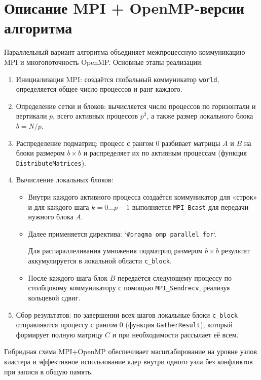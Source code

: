\documentclass[14pt,a4paper]{extarticle}
\begin{document}
\section{Описание MPI + OpenMP-версии алгоритма}

Параллельный вариант алгоритма объединяет межпроцессную коммуникацию MPI и многопоточность OpenMP. Основные этапы реализации:
\begin{enumerate}
  \item Инициализация MPI: создаётся глобальный коммуникатор \texttt{world}, определяется общее число процессов и ранг каждого.
  \item Определение сетки и блоков: вычисляется число процессов по горизонтали и вертикали \(p\), всего активных процессов \(p^2\), а также размер локального блока \(b = N / p\).
  \item Распределение подматриц: процесс с рангом 0 разбивает матрицы \(A\) и \(B\) на блоки размером \(b\times b\) и распределяет их по активным процессам (функция \texttt{DistributeMatrices}).
  \item Вычисление локальных блоков:
    \begin{itemize}
      \item Внутри каждого активного процесса создаётся коммуникатор для «строк» и для каждого шага \(k = 0\dots p-1\) выполняется \texttt{MPI\_Bcast} для передачи нужного блока \(A\).
      \item Далее применяется директива: `\texttt{\#pragma omp parallel for}`.

      Для распараллеливания умножения подматриц размером \(b\times b\) результат аккумулируется в локальной области \texttt{c\_block}.
      \item После каждого шага блок \(B\) передаётся следующему процессу по столбцовому коммуникатору с помощью \texttt{MPI\_Sendrecv}, реализуя кольцевой сдвиг.
    \end{itemize}
  \item Сбор результатов: по завершении всех шагов локальные блоки \texttt{c\_block} отправляются процессу с рангом 0 (функция \texttt{GatherResult}), который формирует полную матрицу \(C\) и при необходимости рассылает её всем.
\end{enumerate}

Гибридная схема MPI+OpenMP обеспечивает масштабирование на уровне узлов кластера и эффективное использование ядер внутри одного узла без конфликтов при записи в общую память.
\newpage
\end{document}
